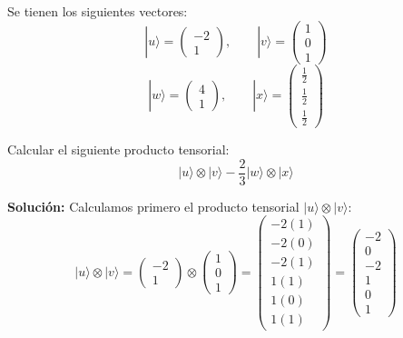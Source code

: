 \documentclass[11pt,a4paper]{article}
\begin{document}
Se tienen los siguientes vectores:
$$|u\rangle= \begin{pmatrix} -2\\ 1 \end{pmatrix}, \qquad |v\rangle= \begin{pmatrix} 1\\ 0\\ 1 \end{pmatrix}$$
$$|w\rangle= \begin{pmatrix} 4\\ 1 \end{pmatrix}, \qquad |x\rangle= \begin{pmatrix} \frac{1}{2}\\ \frac{1}{2}\\ \frac{1}{2} \end{pmatrix}$$

Calcular el siguiente producto tensorial:
$$|u\rangle\otimes|v\rangle -\frac{2}{3} |w\rangle\otimes|x\rangle$$

\vspace{0.5em}
\textbf{Solución:}
Calculamos primero el producto tensorial $|u\rangle\otimes|v\rangle$:
$$|u\rangle\otimes|v\rangle = \begin{pmatrix} -2 \\ 1 \end{pmatrix} \otimes \begin{pmatrix} 1 \\ 0 \\ 1 \end{pmatrix} = \begin{pmatrix} -2(1) \\ -2(0) \\ -2(1) \\ 1(1) \\ 1(0) \\ 1(1) \end{pmatrix} = \begin{pmatrix} -2 \\ 0 \\ -2 \\ 1 \\ 0 \\ 1 \end{pmatrix}$$
\end{document}
